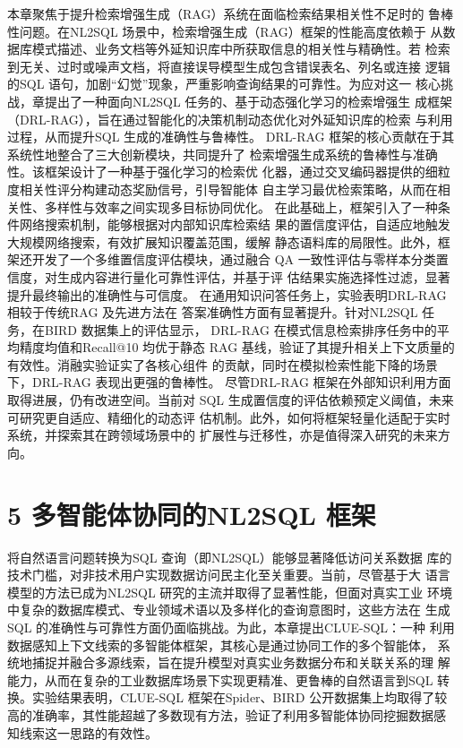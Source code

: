 \documentclass[12pt,a4paper,openright,UTF8]{ctexbook}
\begin{document}
本章聚焦于提升检索增强生成（RAG）系统在面临检索结果相关性不足时的 鲁棒性问题。在NL2SQL 场景中，检索增强生成（RAG）框架的性能高度依赖于 从数据库模式描述、业务文档等外延知识库中所获取信息的相关性与精确性。若 检索到无关、过时或噪声文档，将直接误导模型生成包含错误表名、列名或连接 逻辑的SQL 语句，加剧“幻觉”现象，严重影响查询结果的可靠性。为应对这一 核心挑战，章提出了一种面向NL2SQL 任务的、基于动态强化学习的检索增强生 成框架（DRL-RAG），旨在通过智能化的决策机制动态优化对外延知识库的检索 与利用过程，从而提升SQL 生成的准确性与鲁棒性。 DRL-RAG 框架的核心贡献在于其系统性地整合了三大创新模块，共同提升了 检索增强生成系统的鲁棒性与准确性。该框架设计了一种基于强化学习的检索优 化器，通过交叉编码器提供的细粒度相关性评分构建动态奖励信号，引导智能体 自主学习最优检索策略，从而在相关性、多样性与效率之间实现多目标协同优化。 在此基础上，框架引入了一种条件网络搜索机制，能够根据对内部知识库检索结 果的置信度评估，自适应地触发大规模网络搜索，有效扩展知识覆盖范围，缓解 静态语料库的局限性。此外，框架还开发了一个多维置信度评估模块，通过融合 QA 一致性评估与零样本分类置信度，对生成内容进行量化可靠性评估，并基于评 估结果实施选择性过滤，显著提升最终输出的准确性与可信度。 在通用知识问答任务上，实验表明DRL-RAG 相较于传统RAG 及先进方法在 答案准确性方面有显著提升。针对NL2SQL 任务，在BIRD 数据集上的评估显示， DRL-RAG 在模式信息检索排序任务中的平均精度均值和Recall@10 均优于静态 RAG 基线，验证了其提升相关上下文质量的有效性。消融实验证实了各核心组件 的贡献，同时在模拟检索性能下降的场景下，DRL-RAG 表现出更强的鲁棒性。 尽管DRL-RAG 框架在外部知识利用方面取得进展，仍有改进空间。当前对 SQL 生成置信度的评估依赖预定义阈值，未来可研究更自适应、精细化的动态评 估机制。此外，如何将框架轻量化适配于实时系统，并探索其在跨领域场景中的 扩展性与迁移性，亦是值得深入研究的未来方向。

\chapter{5 多智能体协同的NL2SQL 框架}

将自然语言问题转换为SQL 查询（即NL2SQL）能够显著降低访问关系数据 库的技术门槛，对非技术用户实现数据访问民主化至关重要。当前，尽管基于大 语言模型的方法已成为NL2SQL 研究的主流并取得了显著性能，但面对真实工业 环境中复杂的数据库模式、专业领域术语以及多样化的查询意图时，这些方法在 生成SQL 的准确性与可靠性方面仍面临挑战。为此，本章提出CLUE-SQL：一种 利用数据感知上下文线索的多智能体框架，其核心是通过协同工作的多个智能体， 系统地捕捉并融合多源线索，旨在提升模型对真实业务数据分布和关联关系的理 解能力，从而在复杂的工业数据库场景下实现更精准、更鲁棒的自然语言到SQL 转换。实验结果表明，CLUE-SQL 框架在Spider、BIRD 公开数据集上均取得了较 高的准确率，其性能超越了多数现有方法，验证了利用多智能体协同挖掘数据感 知线索这一思路的有效性。
\end{document}
